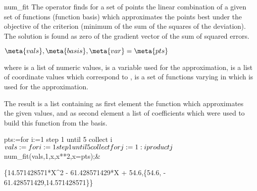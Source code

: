\begin{Operator}{num_fit}
The operator  finds for a set of
points the linear combination of a given set of
functions (function basis) which approximates the
points best under the objective of the 
criterion (minimum of the sum of the squares of the deviation).
The solution is found as zero of the
gradient vector of the sum of squared errors.


\begin{Syntax}
   \(\meta{vals},\meta{basis},\meta{var}=\meta{pts}\)
\end{Syntax}
 
where  is a list of numeric values,
 is a variable used for the approximation,
 is a list of coordinate values which correspond to 
,
 is a set of functions varying in  which is used
  for the approximation.
 

The result is a list containing as first element the
function which approximates the given values, and as
second element a list of coefficients which were used
to build this function from the basis.
  
\begin{Examples}
 
pts:=for i:=1 step 1 until 5 collect i$\\
vals:=for i:=1 step 1 until 5 collect\\
            for j:=1:i product j$\\
num_fit(vals,{1,x,x**2},x=pts);&
\begin{multilineoutput}{6cm}
    \{14.571428571*X^2  - 61.428571429*X + 54.6,\{54.6,
         - 61.428571429,14.571428571\}\}
\end{multilineoutput}

\end{Examples}

\end{Operator}
